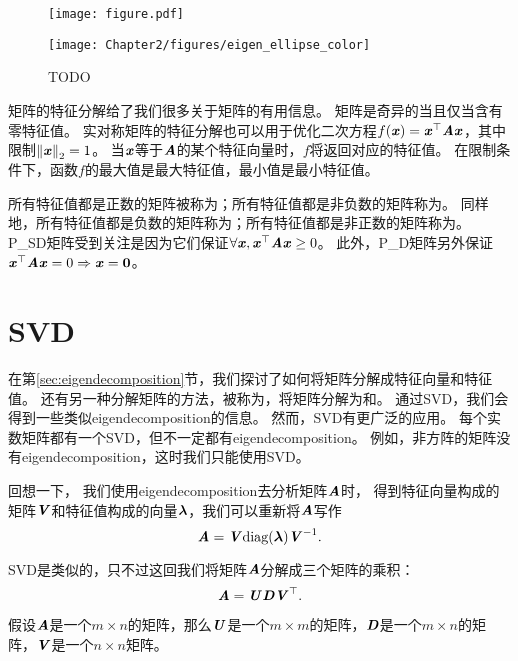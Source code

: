 \begin{figure}[!htb]
\ifOpenSource
\centerline{\texttt{[image: figure.pdf]}}
\else
\centerline{\texttt{[image: Chapter2/figures/eigen\_ellipse\_color]}}
\fi
\caption{TODO}
\label{fig:chap2_eigen_ellipse}
\end{figure}



矩阵的特征分解给了我们很多关于矩阵的有用信息。
矩阵是奇异的当且仅当含有零特征值。
实对称矩阵的特征分解也可以用于优化二次方程$f(\boldsymbol{\mathit{x}}) = \boldsymbol{\mathit{x}}^\top \boldsymbol{\mathit{A}} \boldsymbol{\mathit{x}}$，其中限制$\left\lVert\boldsymbol{\mathit{x}}\right\rVert_2 = 1$。
当$\boldsymbol{\mathit{x}}$等于$\boldsymbol{\mathit{A}}$的某个特征向量时，$f$将返回对应的特征值。
在限制条件下，函数$f$的最大值是最大特征值，最小值是最小特征值。


所有特征值都是正数的矩阵被称为；所有特征值都是非负数的矩阵称为。
同样地，所有特征值都是负数的矩阵称为；所有特征值都是非正数的矩阵称为。
\gls{P_SD}矩阵受到关注是因为它们保证$\forall \boldsymbol{\mathit{x}}, \boldsymbol{\mathit{x}}^\top \boldsymbol{\mathit{A}} \boldsymbol{\mathit{x}} \geq 0$。
此外，\gls{P_D}矩阵另外保证$\boldsymbol{\mathit{x}}^\top \boldsymbol{\mathit{A}} \boldsymbol{\mathit{x}} =0 \Rightarrow \boldsymbol{\mathit{x}} = \mathbf{0}$。





\section{\gls{SVD}}
\label{sec:singular_value_decomposition}

在第\ref{sec:eigendecomposition}节，我们探讨了如何将矩阵分解成特征向量和特征值。
还有另一种分解矩阵的方法，被称为，将矩阵分解为和。
通过\gls{SVD}，我们会得到一些类似\gls{eigendecomposition}的信息。
然而，\gls{SVD}有更广泛的应用。
每个实数矩阵都有一个\gls{SVD}，但不一定都有\gls{eigendecomposition}。
例如，非方阵的矩阵没有\gls{eigendecomposition}，这时我们只能使用\gls{SVD}。


回想一下， 我们使用\gls{eigendecomposition}去分析矩阵$\boldsymbol{\mathit{A}}$时， 得到特征向量构成的矩阵$\boldsymbol{\mathit{V}}$和特征值构成的向量$\boldsymbol{\lambda}$，我们可以重新将$\boldsymbol{\mathit{A}}$写作
\begin{equation}
    \boldsymbol{\mathit{A}}=\boldsymbol{\mathit{V}}\text{diag}(\boldsymbol{\lambda})\boldsymbol{\mathit{V}}^{-1}.
\end{equation}

\gls{SVD}是类似的，只不过这回我们将矩阵$\boldsymbol{\mathit{A}}$分解成三个矩阵的乘积：
\begin{equation}
    \boldsymbol{\mathit{A}}=\boldsymbol{\mathit{U}}\boldsymbol{\mathit{D}}\boldsymbol{\mathit{V}}^\top.
\end{equation}


假设$\boldsymbol{\mathit{A}}$是一个$m\times n$的矩阵，那么$\boldsymbol{\mathit{U}}$是一个$m\times m$的矩阵，$\boldsymbol{\mathit{D}}$是一个$m\times n$的矩阵，$\boldsymbol{\mathit{V}}$是一个$n\times n$矩阵。


